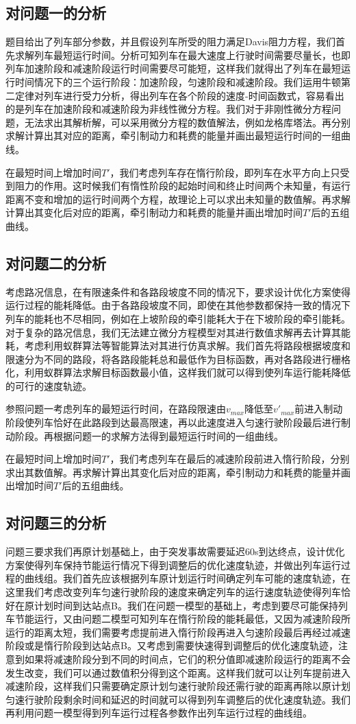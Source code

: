 \documentclass[12pt,a4paper]{nmmcm}
\begin{document}
\subsection{对问题一的分析}
题目给出了列车部分参数，并且假设列车所受的阻力满足Davis阻力方程，我们首先求解列车最短运行时间。分析可知列车在最大速度上行驶时间需要尽量长，也即列车加速阶段和减速阶段运行时间需要尽可能短，这样我们就得出了列车在最短运行时间情况下的三个运行阶段：加速阶段，匀速阶段和减速阶段。我们运用牛顿第二定律对列车进行受力分析，得出列车在各个阶段的速度-时间函数式，容易看出的是列车在加速阶段和减速阶段为非线性微分方程。我们对于非刚性微分方程问题，无法求出其解析解，可以采用微分方程的数值解法，例如龙格库塔法。再分别求解计算出其对应的距离，牵引制动力和耗费的能量并画出最短运行时间的一组曲线。

在最短时间上增加时间$T'$，我们考虑列车存在惰行阶段，即列车在水平方向上只受到阻力的作用。这时候我们有惰性阶段的起始时间和终止时间两个未知量，有运行距离不变和增加的运行时间两个方程，故理论上可以求出未知量的数值解。再求解计算出其变化后对应的距离，牵引制动力和耗费的能量并画出增加时间$T'$后的五组曲线。
\subsection{对问题二的分析}
考虑路况信息，在有限速条件和各路段坡度不同的情况下，要求设计优化方案使得运行过程的能耗降低。由于各路段坡度不同，即使在其他参数都保持一致的情况下列车的能耗也不尽相同，例如在上坡阶段的牵引能耗大于在下坡阶段的牵引能耗。对于复杂的路况信息，我们无法建立微分方程模型对其进行数值求解再去计算其能耗，考虑利用蚁群算法等智能算法对其进行仿真求解。我们首先将路段根据坡度和限速分为不同的路段，将各路段能耗总和最低作为目标函数，再对各路段进行栅格化，利用蚁群算法求解目标函数最小值，这样我们就可以得到使列车运行能耗降低的可行的速度轨迹。

参照问题一考虑列车的最短运行时间，在路段限速由$v_{max}$降低至$v'_{max}$前进入制动阶段使列车恰好在此路段到达最高限速，再以此速度进入匀速行驶阶段最后进行制动阶段。再根据问题一的求解方法得到最短运行时间的一组曲线。

在最短时间上增加时间$T'$，我们考虑列车在最后的减速阶段前进入惰行阶段，分别求出其数值解。再求解计算出其变化后对应的距离，牵引制动力和耗费的能量并画出增加时间$T'$后的五组曲线。
\subsection{对问题三的分析}
问题三要求我们再原计划基础上，由于突发事故需要延迟60s到达终点，设计优化方案使得列车保持节能运行情况下得到调整后的优化速度轨迹，并做出列车运行过程的曲线组。我们首先应该根据列车原计划运行时间确定列车可能的速度轨迹，在这里我们考虑改变列车匀速行驶阶段的速度来确定列车的运行速度轨迹使得列车恰好在原计划时间到达站点B。我们在问题一模型的基础上，考虑到要尽可能保持列车节能运行，又由问题二模型可知列车在惰行阶段的能耗最低，又因为减速阶段所运行的距离太短，我们需要考虑提前进入惰行阶段再进入匀速阶段最后再经过减速阶段或是惰行阶段到达站点B。又考虑到需要快速得到调整后的优化速度轨迹，注意到如果将减速阶段分到不同的时间点，它们的积分值即减速阶段运行的距离不会发生改变，我们可以通过数值积分得到这个距离。这样我们就可以让列车提前进入减速阶段，这样我们只需要确定原计划匀速行驶阶段还需行驶的距离再除以原计划匀速行驶阶段剩余时间和延迟的时间就可以得到列车调整后的优化速度轨迹。我们再利用问题一模型得到列车运行过程各参数作出列车运行过程的曲线组。
\end{document}
